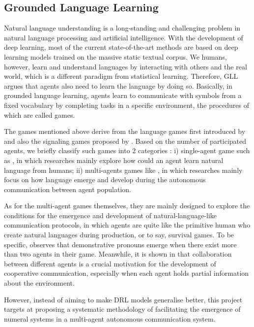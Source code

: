 \documentclass[a4paper,11pt]{article}
\begin{document}
\subsection{Grounded Language Learning}
\label{ssec:2.2ma_gll}

Natural language understanding is a long-standing and challenging problem in natural language processing and artificial intelligence. With the development of deep learning, most of the current state-of-the-art methods are based on deep learning models trained on the massive static textual corpus. We humans, however, learn and understand languages by interacting with others and the real world, which is a different paradigm from statistical learning. Therefore, GLL argues that agents also need to learn the language by doing so. Basically, in grounded language learning, agents learn to communicate with symbols from a fixed vocabulary by completing tasks in a specific environment, the procedures of which are called games.

The games mentioned above derive from the language games first introduced by \cite{wittgenstein2009philosophical} and also the signaling games proposed by \cite{lewis2008convention}. Based on the number of participated agents, we briefly classify such games into 2 categories : i) single-agent game such as \cite{hermann2017grounded, yu2018interactive, das2018embodied}, in which researches mainly explore how could an agent learn natural language from humans; ii) multi-agents games like \cite{mordatch2018emergence, havrylov2017emergence}, in which researches mainly focus on how language emerge and develop during the autonomous communication between agent population.

As for the multi-agent games themselves, they are mainly designed to explore the conditions for the emergence and development of natural-language-like communication protocols, in which agents are quite like the primitive human who create natural languages during production, or to say, survival games. To be specific, \cite{mordatch2018emergence} observes that demonstrative pronouns emerge when there exist more than two agents in their game. Meanwhile, it is shown in \cite{jaques2018intrinsic} that collaboration between different agents is a crucial motivation for the development of cooperative communication, especially when each agent holds partial information about the environment.

However, instead of aiming to make DRL models generalise better, this project targets at proposing a systematic methodology of facilitating the emergence of numeral systems in a multi-agent autonomous communication system.
\end{document}
